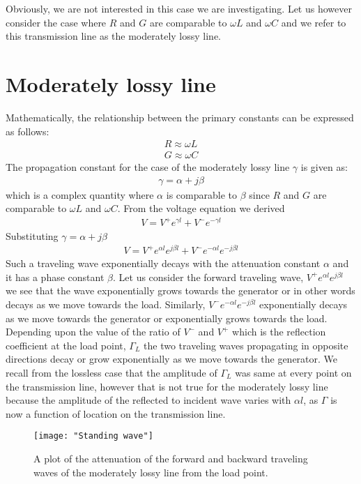 	Obviously, we are not interested in this case we are investigating. Let us however consider the case where $R$ and $G$ are comparable to $\omega L$ and $\omega C$ and we refer to this transmission line as the moderately lossy line.
	\section{Moderately lossy line}Mathematically, the relationship between the primary constants can be expressed as follows:
	\begin{align*}
	R \approx \omega L\\
	G \approx \omega C
	\end{align*}
	The propagation constant for the case of the moderately lossy line $\gamma$ is given as:
	\begin{align*}
	\gamma = \alpha +j\beta
	\end{align*}
	which is a complex quantity where $\alpha$ is comparable to $\beta$ since $R$ and $G$ are comparable to $\omega L$ and $\omega C$. From the voltage equation we derived
	\begin{align*}
	V = V^+e^{\gamma l} + V^-e^{
	-\gamma l}
    \end{align*}
    Substituting $\gamma = \alpha + j\beta$
    \begin{align*}
    V = V^+e^{\alpha l}e^{j\beta l} + V^-e^{-\alpha l}e^{-j\beta l}
	\end{align*}
	Such a traveling wave exponentially decays with the attenuation constant $\alpha$ and it has a phase constant $\beta$. Let us consider the forward traveling wave, $V^+e^{\alpha l}e^{j\beta l}$ we see that the wave exponentially grows towards the generator or in other words decays as we move towards the load. Similarly, $V^-e^{-\alpha l}e^{-j\beta l}$ exponentially decays as we move towards the generator or exponentially grows towards the load. Depending upon the value of the ratio of $V^-$ and $V^+$ which is the reflection coefficient at the load point, $\Gamma_L$ the two traveling waves propagating in opposite directions decay or grow exponentially as we move towards the generator. We recall from the lossless case that the amplitude of $\Gamma_L$ was same at every point on the transmission line, however that is not true for the moderately lossy line because the amplitude of the reflected to incident wave varies with $\alpha l$, as $\Gamma$ is now a function of location on the transmission line.
\begin{figure}[h]
	\centering
	\texttt{[image: "Standing wave"]}
	\caption{A plot of the attenuation of the forward and backward traveling waves of the moderately lossy line from the load point.}
\end{figure}
